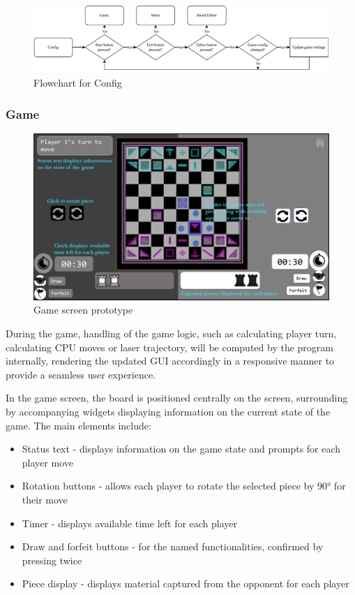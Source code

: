 \documentclass[../main/main.tex]{subfiles}
\begin{document}
\begin{figure}[H]
    \centering
    \includegraphics[width=\columnwidth]{../design/assets/config_flowchart.pdf}
    \caption{Flowchart for Config}
    \label{fig:config-flowchart}
\end{figure}

\subsubsection{Game}
\begin{figure}[H]
    \centering
    \includegraphics[width=0.8\columnwidth]{../design/assets/game_gui.png}
    \caption{Game screen prototype}
    \label{fig:game-gui}
\end{figure}

During the game, handling of the game logic, such as calculating player turn, calculating CPU moves or laser trajectory, will be computed by the program internally, rendering the updated GUI accordingly in a responsive manner to provide a seamless user experience.

In the game screen, the board is positioned centrally on the screen, surrounding by accompanying widgets displaying information on the current state of the game. The main elements include:

\begin{itemize}
\item Status text - displays information on the game state and prompts for each player move
\item Rotation buttons - allows each player to rotate the selected piece by 90° for their move
\item Timer - displays available time left for each player
\item Draw and forfeit buttons - for the named functionalities, confirmed by pressing twice
\item Piece display - displays material captured from the opponent for each player
\end{itemize}
\end{document}
